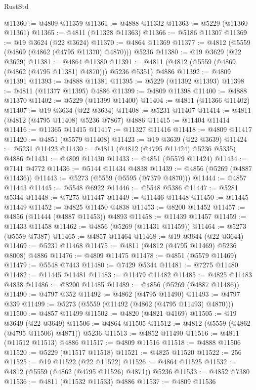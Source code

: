 \begin{lexlean}{RustStd}
\begin{coremodule}
@11360 := @4809 @11359
@11361 := @4888 @11332
@11363 := @5229 (@11360 @11361)
@11365 := @4811 (@11328 @11363)
@11366 := @5186 @11307
@11369 := @19 @3624 (@22 @3624)
@11370 := @4864 @11369
@11377 := @4812 (@5559 (@4869 (@4862 (@4795 @11370) @4870))) @5236
@11380 := @19 @3629 (@22 @3629)
@11381 := @4864 @11380
@11391 := @4811 (@4812 (@5559 (@4869 (@4862 (@4795 @11381) @4870))) @5236 @5351) @4886
@11392 := @4809 @11391
@11393 := @4888 @11381
@11395 := @5229 (@11392 @11393)
@11398 := @4811 (@11377 @11395) @4886
@11399 := @4809 @11398
@11400 := @4888 @11370
@11402 := @5229 (@11399 @11400)
@11404 := @4811 (@11366 @11402)
@11407 := @19 @3634 (@22 @3634)
@11408 := @5231 @11407
@11414 := @4811 (@4812 (@4795 @11408) @5236 @7867) @4886
@11415 := @11404 @11414
@11416 := @11365 @11415
@11417 := @11327 @11416
@11418 := @4809 @11417
@11420 := @4851 (@5579 @11408)
@11423 := @19 @3639 (@22 @3639)
@11424 := @5231 @11423
@11430 := @4811 (@4812 (@4795 @11424) @5236 @5335) @4886
@11431 := @4809 @11430
@11433 := @4851 (@5579 @11424)
@11434 := @7141 @4772
@11436 := @5144 @11434 @4838
@11439 := @4856 (@5269 (@4887 @11436))
@11443 := @5273 (@5559 (@5595 (@7379 @4870)))
@11444 := @4857 @11443
@11445 := @5548 @6922
@11446 := @5548 @5386
@11447 := @5281 @5344
@11448 := @7275 @11447
@11449 := @11446 @11448
@11450 := @11445 @11449
@11452 := @4825 @11450 @4838
@11453 := @8200 @11452
@11457 := @4856 (@11444 (@4887 @11453)) @4893
@11458 := @11439 @11457
@11459 := @11433 @11458
@11462 := @4856 (@5269 (@11431 @11459))
@11464 := @5273 (@5559 @7387)
@11465 := @4857 @11464
@11468 := @19 @3644 (@22 @3644)
@11469 := @5231 @11468
@11475 := @4811 (@4812 (@4795 @11469) @5236 @8008) @4886
@11476 := @4809 @11475
@11478 := @4851 (@5579 @11469)
@11479 := @5548 @7443
@11480 := @7429 @5344
@11481 := @7275 @11480
@11482 := @11445 @11481
@11483 := @11479 @11482
@11485 := @4825 @11483 @4838
@11486 := @8200 @11485
@11489 := @4856 (@5269 (@4887 @11486))
@11490 := @4797 @352
@11492 := @4862 (@4795 @11490)
@11493 := @4797 @339
@11499 := @5273 (@5559 (@11492 (@4862 (@4795 @11493) @4870)))
@11500 := @4857 @11499
@11502 := @4820 (@4821 @4169)
@11505 := @19 @3649 (@22 @3649)
@11506 := @4864 @11505
@11512 := @4812 (@5559 (@4862 (@4795 @11506) @4871)) @5236
@11513 := @4852 @11490
@11516 := @4811 (@11512 @11513) @4886
@11517 := @4809 @11516
@11518 := @4888 @11506
@11520 := @5229 (@11517 @11518)
@11521 := @4825 @11520
@11522 := 256
@11525 := @19 @11522 (@22 @11522)
@11526 := @4864 @11525
@11532 := @4812 (@5559 (@4862 (@4795 @11526) @4871)) @5236
@11533 := @4852 @7380
@11536 := @4811 (@11532 @11533) @4886
@11537 := @4809 @11536

\end{coremodule}
\end{lexlean}
